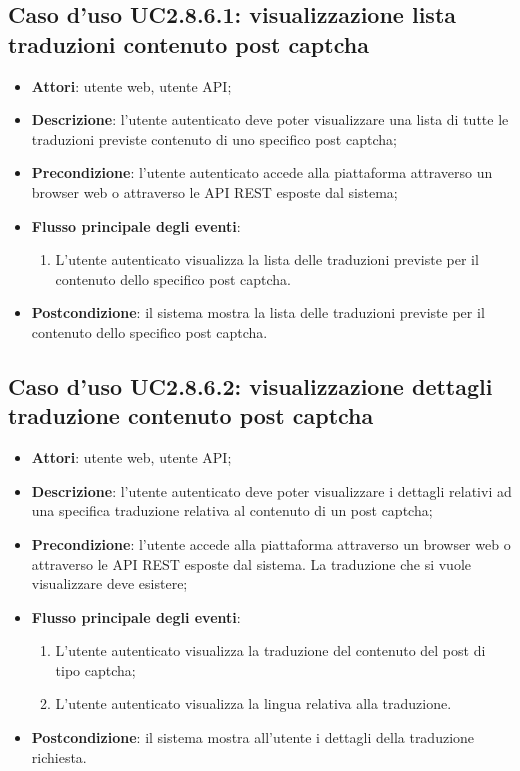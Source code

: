 \subsection{Caso d'uso UC2.8.6.1: visualizzazione lista traduzioni contenuto post captcha}
\begin{itemize}
\item \textbf{Attori}: utente web, utente API;
\item \textbf{Descrizione}: l'utente autenticato deve poter visualizzare una lista di tutte le traduzioni previste contenuto di uno specifico post captcha; 
      \item \textbf{Precondizione}: l'utente autenticato accede alla piattaforma attraverso un browser web o attraverso le API REST esposte dal sistema;

        \item \textbf{Flusso principale degli eventi}:
          \begin{enumerate}
          \item L'utente autenticato visualizza la lista delle traduzioni previste per il contenuto dello specifico post captcha.

      \end{enumerate}
    \item \textbf{Postcondizione}: il sistema mostra la lista delle traduzioni previste per il contenuto dello specifico post captcha.
  \end{itemize}
\hypertarget{UC2.8.6.2}{}
\subsection{Caso d'uso UC2.8.6.2: visualizzazione dettagli traduzione contenuto post captcha}
\begin{itemize}
\item \textbf{Attori}: utente web, utente API;
\item \textbf{Descrizione}: l'utente autenticato deve poter visualizzare i dettagli relativi ad una specifica traduzione relativa al contenuto di un post captcha; 
      \item \textbf{Precondizione}: l'utente accede alla piattaforma attraverso un browser web o attraverso le API REST esposte dal sistema. La traduzione che si vuole visualizzare deve esistere;

        \item \textbf{Flusso principale degli eventi}:
          \begin{enumerate}
          \item L'utente autenticato visualizza la traduzione del contenuto del post di tipo captcha;
          \item L'utente autenticato visualizza la lingua relativa alla traduzione.

      \end{enumerate}
    \item \textbf{Postcondizione}: il sistema mostra all'utente i dettagli della traduzione richiesta.
  \end{itemize}
\hypertarget{UC2.8.6.3}{}
